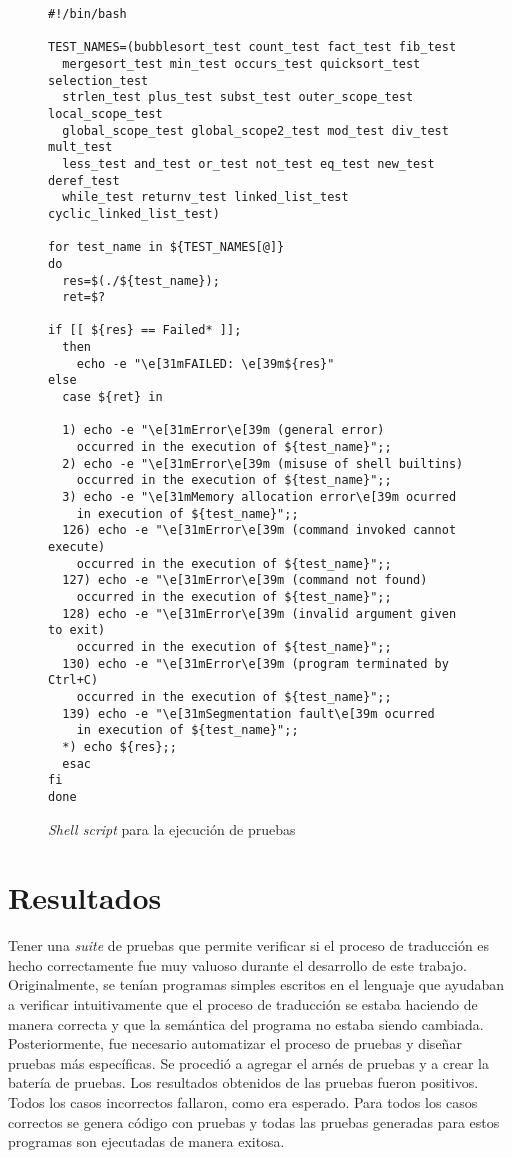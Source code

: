 \begin{figure}
\begin{lstlisting}
#!/bin/bash

TEST_NAMES=(bubblesort_test count_test fact_test fib_test
  mergesort_test min_test occurs_test quicksort_test selection_test
  strlen_test plus_test subst_test outer_scope_test local_scope_test
  global_scope_test global_scope2_test mod_test div_test mult_test
  less_test and_test or_test not_test eq_test new_test deref_test
  while_test returnv_test linked_list_test cyclic_linked_list_test)

for test_name in ${TEST_NAMES[@]}
do
  res=$(./${test_name});
  ret=$?

if [[ ${res} == Failed* ]];
  then
    echo -e "\e[31mFAILED: \e[39m${res}"
else
  case ${ret} in

  1) echo -e "\e[31mError\e[39m (general error)
    occurred in the execution of ${test_name}";;
  2) echo -e "\e[31mError\e[39m (misuse of shell builtins)
    occurred in the execution of ${test_name}";;
  3) echo -e "\e[31mMemory allocation error\e[39m ocurred
    in execution of ${test_name}";;
  126) echo -e "\e[31mError\e[39m (command invoked cannot execute)
    occurred in the execution of ${test_name}";;
  127) echo -e "\e[31mError\e[39m (command not found)
    occurred in the execution of ${test_name}";;
  128) echo -e "\e[31mError\e[39m (invalid argument given to exit)
    occurred in the execution of ${test_name}";;
  130) echo -e "\e[31mError\e[39m (program terminated by Ctrl+C)
    occurred in the execution of ${test_name}";;
  139) echo -e "\e[31mSegmentation fault\e[39m ocurred
    in execution of ${test_name}";;
  *) echo ${res};;
  esac
fi
done
\end{lstlisting}

\caption{\textit{Shell script} para la ejecución de pruebas}
\label{fig:bash_script}
\end{figure}

\section{Resultados}\label{section:results}

Tener una \textit{suite} de pruebas que permite verificar si el proceso de traducción es hecho correctamente fue muy valuoso durante el desarrollo de este trabajo.
Originalmente, se tenían programas simples escritos en el lenguaje que ayudaban a verificar intuitivamente que el proceso de traducción se estaba haciendo de manera correcta y que la semántica del programa no estaba siendo cambiada.
Posteriormente, fue necesario automatizar el proceso de pruebas y diseñar pruebas más específicas.
Se procedió a agregar el arnés de pruebas y a crear la batería de pruebas.
Los resultados obtenidos de las pruebas fueron positivos.
Todos los casos incorrectos fallaron, como era esperado.
Para todos los casos correctos se genera código con pruebas y todas las pruebas generadas para estos programas son ejecutadas de manera exitosa.

